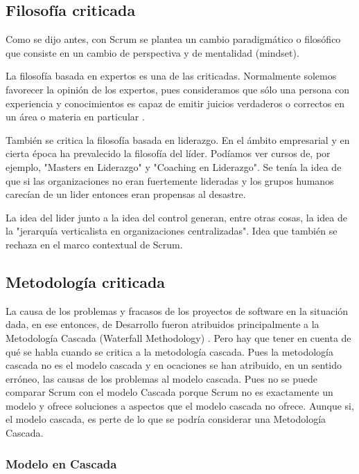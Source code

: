\subsection{Filosofía criticada}

Como se dijo antes, con Scrum se plantea un cambio paradigmático o filosófico que consiste en un cambio de perspectiva y de mentalidad (mindset).

La filosofía basada en expertos es una de las criticadas. Normalmente solemos favorecer la opinión de los expertos, pues consideramos que sólo una persona con experiencia y conocimientos es capaz de emitir juicios verdaderos o correctos en un área o materia en particular \cite{James-Surowiecki-2005}.

También se critica la filosofía basada en liderazgo. En el ámbito empresarial y en cierta época ha prevalecido la filosofía del líder. Podíamos ver cursos de, por ejemplo, "Masters en Liderazgo" y "Coaching en Liderazgo". Se tenía la idea de que si las organizaciones no eran fuertemente lideradas y los grupos humanos carecían de un lider entonces eran propensas al desastre.

La idea del lider junto a la idea del control generan, entre otras cosas, la idea de la "jerarquía verticalista en organizaciones centralizadas". Idea que también se rechaza en el marco contextual de Scrum.

\subsection{Metodología criticada}

La causa de los problemas y fracasos de los proyectos de software en la situación dada, en ese entonces, de Desarrollo fueron atribuidos principalmente a la Metodología Cascada (Waterfall Methodology) \cite{Ken-Schwaber-1995}. Pero hay que tener en cuenta de qué se habla cuando se critica a la metodología cascada. Pues la metodología cascada no es el modelo cascada y en ocaciones se han atribuido, en un sentido erróneo, las causas de los problemas al modelo cascada. Pues no se puede comparar Scrum con el modelo Cascada porque Scrum no es exactamente un modelo y ofrece soluciones a aspectos que el modelo cascada no ofrece. Aunque si, el modelo cascada, es perte de lo que se podría considerar una Metodología Cascada. 

\subsubsection{Modelo en Cascada}

